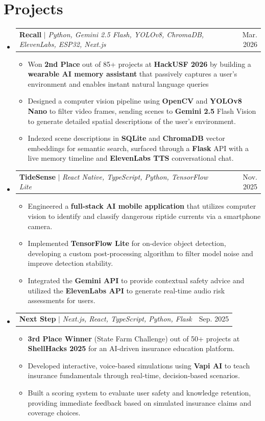 \documentclass[letterpaper,11pt]{article}
\makeatletter
\newcommand{\resumeItem}[1]{
  \item\normalsize{
    {#1 \vspace{-2pt}}
  }
}
\newcommand{\resumeProjectHeading}[2]{
    \item
    \begin{tabular*}{0.97\textwidth}{l@{\extracolsep{\fill}}r}
      \small#1 & #2 \\
    \end{tabular*}\vspace{-10pt}
}
\newcommand{\resumeSubHeadingListStart}{\begin{itemize}[leftmargin=0.15in, label={}]}
\newcommand{\resumeSubHeadingListEnd}{\end{itemize}}
\newcommand{\resumeItemListStart}{\begin{itemize}}
\newcommand{\resumeItemListEnd}{\end{itemize}\vspace{-10pt}}
\makeatother
\begin{document}
\section{Projects}
  \resumeSubHeadingListStart
 \resumeProjectHeading
  {\textbf{Recall} $|$ \emph{Python, Gemini 2.5 Flash, YOLOv8, ChromaDB, ElevenLabs, ESP32, Next.js}}{Mar. 2026}
  \resumeItemListStart
    \resumeItem{Won \textbf{2nd Place} out of 85+ projects at \textbf{HackUSF 2026} by building a \textbf{wearable AI memory assistant} that passively captures a user's environment and enables instant natural language queries}
 \resumeItem{Designed a computer vision pipeline using \textbf{OpenCV} and \textbf{YOLOv8 Nano} to filter video frames, sending scenes to \textbf{Gemini 2.5} Flash Vision to generate detailed spatial descriptions of the user's environment.}
\resumeItem{Indexed scene descriptions in \textbf{SQLite} and \textbf{ChromaDB} vector embeddings for semantic search, surfaced through a \textbf{Flask} API with a live memory timeline and \textbf{ElevenLabs TTS} conversational chat.}
\resumeItemListEnd
  
    \resumeProjectHeading
  {\textbf{TideSense} $|$ \emph{React Native, TypeScript, Python, TensorFlow Lite}}{Nov. 2025}
  \resumeItemListStart
    \resumeItem{Engineered a \textbf{full-stack AI mobile application} that utilizes computer vision to identify and classify dangerous riptide currents via a smartphone camera.}
    \resumeItem{Implemented \textbf{TensorFlow Lite} for on-device object detection, developing a custom post-processing algorithm to filter model noise and improve detection stability.}
    \resumeItem{Integrated the \textbf{Gemini API} to provide contextual safety advice and utilized the \textbf{ElevenLabs API} to generate real-time audio risk assessments for users.}
  \resumeItemListEnd


  
\resumeProjectHeading
  {\textbf{Next Step} $|$ \emph{Next.js, React, TypeScript, Python, Flask}}{Sep. 2025}
  \resumeItemListStart
    \resumeItem{\textbf{3rd Place Winner} (State Farm Challenge) out of 50+ projects at \textbf{ShellHacks 2025} for an AI-driven insurance education platform.}
    \resumeItem{Developed interactive, voice-based simulations using \textbf{Vapi AI} to teach insurance fundamentals through real-time, decision-based scenarios.}
    \resumeItem{Built a scoring system to evaluate user safety and knowledge retention, providing immediate feedback based on simulated insurance claims and coverage choices.}
  \resumeItemListEnd

  \resumeSubHeadingListEnd




\vspace{1.5pt}
\end{document}
